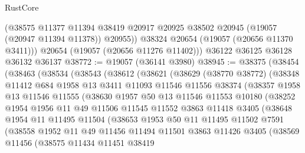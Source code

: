 \begin{lexlean}{RustCore}
\begin{coremodule}
          (@38575
            @11377
            @11394
            @38419
            @20917
            @20925
            @38502
            @20945
            (@19057 (@20947 @11394 @11378))
            @20955))
        @38324
        @20654
        (@19057 (@20656 @11370 @3411)))
      @20654
      (@19057 (@20656 @11276 @11402)))
    @36122
    @36125
    @36128
    @36132
    @36137
@38772 := @19057 (@36141 @3980)
@38945 := @38375
    (@38454
      (@38463
        (@38534
          (@38543
            (@38612
              (@38621
                (@38629
                  (@38770 @38772)
                  (@38348
                    @11412
                    @684
                    @1958
                    @13
                    @3411
                    @11093
                    @11546
                    @11556
                    @38374
                    (@38357
                      @1958
                      @13
                      @11546
                      @11555
                      (@38630
                        @1957
                        @50
                        @13
                        @11546
                        @11553
                        @10180
                        (@38252
                          @1954
                          @1956
                          @11
                          @49
                          @11506
                          @11545
                          @11552
                          @3863
                          @11418
                          @3405
                          (@38648
                            @1954
                            @11
                            @11495
                            @11504
                            (@38653
                              @1953
                              @50
                              @11
                              @11495
                              @11502
                              @7591
                              (@38558
                                @1952
                                @11
                                @49
                                @11456
                                @11494
                                @11501
                                @3863
                                @11426
                                @3405
                                (@38569
                                  @11456
                                  (@38575
                                    @11434
                                    @11451
                                    @38419

\end{coremodule}
\end{lexlean}
